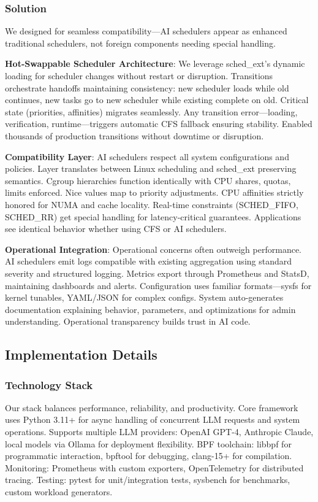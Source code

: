\subsubsection{Solution}
We designed for seamless compatibility—AI schedulers appear as enhanced traditional schedulers, not foreign components needing special handling.

\textbf{Hot-Swappable Scheduler Architecture}: We leverage sched\_ext's dynamic loading for scheduler changes without restart or disruption. Transitions orchestrate handoffs maintaining consistency: new scheduler loads while old continues, new tasks go to new scheduler while existing complete on old. Critical state (priorities, affinities) migrates seamlessly. Any transition error—loading, verification, runtime—triggers automatic CFS fallback ensuring stability. Enabled thousands of production transitions without downtime or disruption.

\textbf{Compatibility Layer}: AI schedulers respect all system configurations and policies. Layer translates between Linux scheduling and sched\_ext preserving semantics. Cgroup hierarchies function identically with CPU shares, quotas, limits enforced. Nice values map to priority adjustments. CPU affinities strictly honored for NUMA and cache locality. Real-time constraints (SCHED\_FIFO, SCHED\_RR) get special handling for latency-critical guarantees. Applications see identical behavior whether using CFS or AI schedulers.

\textbf{Operational Integration}: Operational concerns often outweigh performance. AI schedulers emit logs compatible with existing aggregation using standard severity and structured logging. Metrics export through Prometheus and StatsD, maintaining dashboards and alerts. Configuration uses familiar formats—sysfs for kernel tunables, YAML/JSON for complex configs. System auto-generates documentation explaining behavior, parameters, and optimizations for admin understanding. Operational transparency builds trust in AI code.

\subsection{Implementation Details}

\subsubsection{Technology Stack}
Our stack balances performance, reliability, and productivity. Core framework uses Python 3.11+ for async handling of concurrent LLM requests and system operations. Supports multiple LLM providers: OpenAI GPT-4, Anthropic Claude, local models via Ollama for deployment flexibility. BPF toolchain: libbpf for programmatic interaction, bpftool for debugging, clang-15+ for compilation. Monitoring: Prometheus with custom exporters, OpenTelemetry for distributed tracing. Testing: pytest for unit/integration tests, sysbench for benchmarks, custom workload generators.

